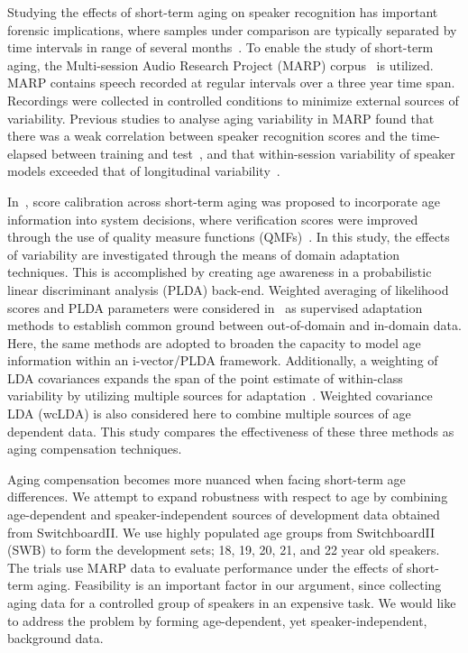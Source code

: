 \documentclass[a4paper]{article}
\begin{document}
Studying the effects of short-term aging on speaker recognition has important forensic implications, where samples under comparison are typically separated by time intervals in range of several months~\cite{paper7}. To enable the study of short-term aging, the Multi-session Audio Research Project (MARP) corpus~\cite{paper12} is utilized. MARP contains speech recorded at regular intervals over a three year time span. Recordings were collected in controlled conditions to minimize external sources of variability. Previous studies to analyse aging variability in MARP found that there was a weak correlation between speaker recognition scores and the time-elapsed between training and test~\cite{paper13}, and that within-session variability of speaker models exceeded that of longitudinal variability~\cite{paper14}.

In~\cite{kellyinterspeech15}, score calibration across short-term aging was proposed to incorporate age information into system decisions, where verification scores were improved through the use of quality measure functions (QMFs)~\cite{paper18}. In this study, the effects of variability are investigated through the means of domain adaptation techniques. This is accomplished by creating age awareness in a probabilistic linear discriminant analysis (PLDA) back-end. Weighted averaging of likelihood scores and PLDA parameters were considered in~\cite{garcia2014supervised} as supervised adaptation methods to establish common ground between out-of-domain and in-domain data. Here, the same methods are adopted to broaden the capacity to model age information within an i-vector/PLDA framework. Additionally, a weighting of LDA covariances expands the span of the point estimate of within-class variability by utilizing multiple sources for adaptation~\cite{weightedLDA}. Weighted covariance LDA (wcLDA) is also considered here to combine multiple sources of age dependent data. This study compares the effectiveness of these three methods as aging compensation techniques.  

Aging compensation becomes more nuanced when facing short-term age differences. We attempt to expand robustness with respect to age by combining age-dependent and speaker-independent sources of development data obtained from SwitchboardII. We use highly populated  age groups from SwitchboardII (SWB) to form the development sets; 18, 19, 20, 21, and 22 year old speakers. The trials use MARP data to evaluate performance under the effects of short-term aging. 
Feasibility is an important factor in our argument, since collecting aging data for a controlled group of speakers in an expensive task. 
We would like to address the problem by forming age-dependent, yet speaker-independent, background data. 
\end{document}
